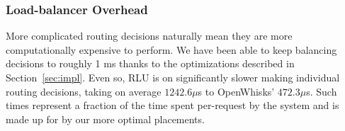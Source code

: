 
\vspace*{-0.2cm}
\subsubsection{Load-balancer Overhead}


More complicated routing decisions naturally mean they are more computationally expensive to perform.
We have been able to keep balancing decisions to roughly 1 ms thanks to the optimizations described in Section~\ref{sec:impl}. 
Even so, RLU is on significantly slower making individual routing decisions, taking on average $1242.6 \mu$s to OpenWhisks' $472.3 \mu$s.
Such times represent a fraction of the time spent per-request by the system and is made up for by our more optimal placements. 
